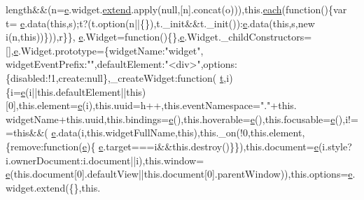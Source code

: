 \begin{DoxyCode}
      length&&(n=\hyperlink{jquery-ui_8min_8js_a2c038346d47955cbe2cb91e338edd7e1}{e}.widget.\hyperlink{jquery-2_80_83_8min_8js_a0203d523c2965441503d5f9d644f2c11}{extend}.apply(null,[n].concat(o))),this.\hyperlink{jquery-2_80_83_8min_8js_acac159895212e159f5cbd2080cc4d737}{each}(function()\{var t=
      \hyperlink{jquery-ui_8min_8js_a2c038346d47955cbe2cb91e338edd7e1}{e}.data(\textcolor{keyword}{this},s);t?(t.option(n||\{\}),t.\_init&&t.\_init()):\hyperlink{jquery-ui_8min_8js_a2c038346d47955cbe2cb91e338edd7e1}{e}.data(\textcolor{keyword}{this},s,\textcolor{keyword}{new} i(n,\textcolor{keyword}{this}))\})),r\}\},
      \hyperlink{jquery-ui_8min_8js_a2c038346d47955cbe2cb91e338edd7e1}{e}.Widget=\textcolor{keyword}{function}()\{\},\hyperlink{jquery-ui_8min_8js_a2c038346d47955cbe2cb91e338edd7e1}{e}.Widget.\_childConstructors=[],\hyperlink{jquery-ui_8min_8js_a2c038346d47955cbe2cb91e338edd7e1}{e}.Widget.prototype=\{widgetName:\textcolor{stringliteral}{"widget"},
      widgetEventPrefix:\textcolor{stringliteral}{""},defaultElement:\textcolor{stringliteral}{"<div>"},options:\{disabled:!1,create:null\},\_createWidget:\textcolor{keyword}{function}(
      \hyperlink{jquery-2_80_83_8min_8js_aaccc9105df5383111407fd5b41255e23}{t},i)\{i=\hyperlink{jquery-ui_8min_8js_a2c038346d47955cbe2cb91e338edd7e1}{e}(i||this.defaultElement||\textcolor{keyword}{this})[0],this.element=\hyperlink{jquery-ui_8min_8js_a2c038346d47955cbe2cb91e338edd7e1}{e}(i),this.uuid=h++,this.eventNamespace=\textcolor{stringliteral}{"."}+this.
      widgetName+this.uuid,this.bindings=\hyperlink{jquery-ui_8min_8js_a2c038346d47955cbe2cb91e338edd7e1}{e}(),this.hoverable=\hyperlink{jquery-ui_8min_8js_a2c038346d47955cbe2cb91e338edd7e1}{e}(),this.focusable=\hyperlink{jquery-ui_8min_8js_a2c038346d47955cbe2cb91e338edd7e1}{e}(),i!==\textcolor{keyword}{this}&&(
      \hyperlink{jquery-ui_8min_8js_a2c038346d47955cbe2cb91e338edd7e1}{e}.data(i,this.widgetFullName,\textcolor{keyword}{this}),this.\_on(!0,this.element,\{\textcolor{keyword}{remove}:\textcolor{keyword}{function}(\hyperlink{jquery-ui_8min_8js_a2c038346d47955cbe2cb91e338edd7e1}{e})\{
      \hyperlink{jquery-ui_8min_8js_a2c038346d47955cbe2cb91e338edd7e1}{e}.target===i&&this.destroy()\}\}),this.document=\hyperlink{jquery-ui_8min_8js_a2c038346d47955cbe2cb91e338edd7e1}{e}(i.style?i.ownerDocument:i.document||i),this.window=
      \hyperlink{jquery-ui_8min_8js_a2c038346d47955cbe2cb91e338edd7e1}{e}(this.document[0].defaultView||this.document[0].parentWindow)),this.options=\hyperlink{jquery-ui_8min_8js_a2c038346d47955cbe2cb91e338edd7e1}{e}.widget.extend(\{\},\textcolor{keyword}{this}.

\end{DoxyCode}

